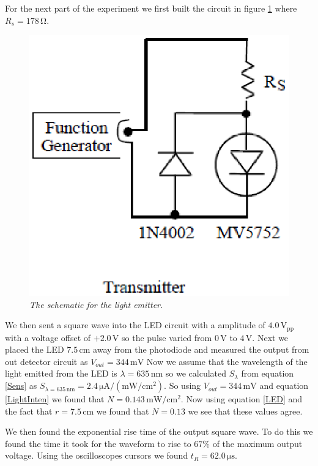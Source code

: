 \documentclass[11pt]{article}
\numberwithin{equation}{section}
\numberwithin{figure}{section}
\numberwithin{table}{section}
\newcommand{\unit}[1]{\ensuremath{\, \mathrm{#1}}}
\begin{document}
For the next part of the experiment we first built the circuit in figure \ref{FigPhotoEmit} where $R_s = 178\unit{\Omega}$.
\begin{figure}[h]
\centering
\includegraphics[scale=0.75]{FigPhotoEmit.eps}
\caption{\textit{The schematic for the light emitter.}}
\label{FigPhotoEmit}
\end{figure}
We then sent a square wave into the LED circuit with a amplitude of $4.0\unit{V_{pp}}$ with a voltage offset of $+2.0\unit{V}$ so the pulse varied from $0\unit{V}$ to $4\unit{V}$. Next we placed the LED $7.5\unit{cm}$ away from the photodiode and measured the output from out detector circuit as $V_{out} = 344\unit{mV}$ Now we assume that the wavelength of the light emitted from the LED is $\lambda = 635\unit{nm}$ so we calculated $S_{\lambda}$ from equation \ref{Sens} as $S_{\lambda=635\unit{nm}} = 2.4\unit{\mu A/(mW/cm^2)}$. So using $V_{out} = 344\unit{mV}$ and equation \ref{LightInten} we found that $N = 0.143\unit{mW/cm^2}$. Now using equation \ref{LED} and the fact that $r=7.5\unit{cm}$ we found that $N=0.13$ we see that these values agree.

We then found the exponential rise time of the output square wave. To do this we found the time it took for the waveform to rise to $67\%$ of the maximum output voltage. Using the oscilloscopes cursors we found $t_R = 62.0\unit{\mu s}$.
\end{document}
